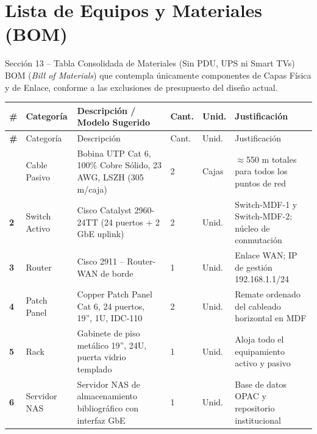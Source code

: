 \documentclass[12pt,a4paper]{article}
\begin{document}
\section{Lista de Equipos y Materiales (BOM)}

\begin{cajanorma}{Sección 13 -- Tabla Consolidada de Materiales (Sin PDU, UPS ni Smart TVs)}
BOM (\textit{Bill of Materials}) que contempla únicamente componentes de Capas Física y de Enlace, conforme a las exclusiones de presupuesto del diseño actual.
\end{cajanorma}

\begin{longtable}{>{\centering\bfseries\small}p{0.5cm}>{\small}p{1.9cm}>{\small}p{4.8cm}>{\centering\small}p{1.1cm}>{\centering\small}p{1cm}>{\small}p{3.6cm}}
  \toprule
  \rowcolor{colorPrincipal}
  \color{white}\#&\color{white}Categoría&\color{white}Descripción / Modelo Sugerido&\color{white}Cant.&\color{white}Unid.&\color{white}Justificación\\
  \midrule\endfirsthead
  \toprule\rowcolor{colorPrincipal}
  \color{white}\#&\color{white}Categoría&\color{white}Descripción&\color{white}Cant.&\color{white}Unid.&\color{white}Justificación\\
  \midrule\endhead\bottomrule\endlastfoot
  1  & Cable Pasivo   & Bobina UTP Cat 6, 100\% Cobre Sólido, 23 AWG, LSZH (305 m/caja) & 2  & Cajas  & $\approx$550 m totales para todos los puntos de red \\
  2  & Switch Activo  & Cisco Catalyst 2960-24TT (24 puertos + 2 GbE uplink)             & 2  & Unid.  & Switch-MDF-1 y Switch-MDF-2; núcleo de conmutación \\
  3  & Router         & Cisco 2911 -- Router-WAN de borde                                & 1  & Unid.  & Enlace WAN; IP de gestión 192.168.1.1/24 \\
  4  & Patch Panel    & Copper Patch Panel Cat 6, 24 puertos, 19'', 1U, IDC-110          & 2  & Unid.  & Remate ordenado del cableado horizontal en MDF \\
  5  & Rack           & Gabinete de piso metálico 19'', 24U, puerta vidrio templado       & 1  & Unid.  & Aloja todo el equipamiento activo y pasivo \\
  6  & Servidor NAS   & Servidor NAS de almacenamiento bibliográfico con interfaz GbE     & 1  & Unid.  & Base de datos OPAC y repositorio institucional \\

\end{longtable}
\end{document}
